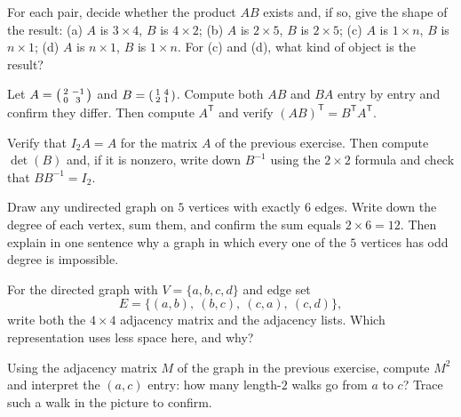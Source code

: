 \begin{exercise}
For each pair, decide whether the product $AB$ exists and, if so, give the shape
of the result: (a) $A$ is $3 \times 4$, $B$ is $4 \times 2$; (b) $A$ is
$2 \times 5$, $B$ is $2 \times 5$; (c) $A$ is $1 \times n$, $B$ is $n \times 1$;
(d) $A$ is $n \times 1$, $B$ is $1 \times n$. For (c) and (d), what kind of object
is the result?
\end{exercise}

\begin{exercise}
Let $A = \begin{psmallmatrix} 2 & -1 \\ 0 & 3 \end{psmallmatrix}$ and
$B = \begin{psmallmatrix} 1 & 4 \\ 2 & 1 \end{psmallmatrix}$. Compute both $AB$
and $BA$ entry by entry and confirm they differ. Then compute $A^{\mathsf T}$ and
verify $(AB)^{\mathsf T} = B^{\mathsf T} A^{\mathsf T}$.
\end{exercise}

\begin{exercise}
Verify that $I_2 A = A$ for the matrix $A$ of the previous exercise. Then compute
$\det(B)$ and, if it is nonzero, write down $B^{-1}$ using the $2 \times 2$
formula and check that $B B^{-1} = I_2$.
\end{exercise}

\begin{exercise}
Draw any undirected graph on $5$ vertices with exactly $6$ edges. Write down the
degree of each vertex, sum them, and confirm the sum equals $2 \times 6 = 12$.
Then explain in one sentence why a graph in which every one of the $5$ vertices
has odd degree is impossible.
\end{exercise}

\begin{exercise}
For the directed graph with $V = \{a,b,c,d\}$ and edge set
\[
E = \{(a,b),\ (b,c),\ (c,a),\ (c,d)\},
\]
write both the $4 \times 4$ adjacency matrix and the adjacency lists. Which
representation uses less space here, and why?
\end{exercise}

\begin{exercise}
Using the adjacency matrix $M$ of the graph in the previous exercise, compute
$M^2$ and interpret the $(a,c)$ entry: how many length-$2$ walks go from $a$ to
$c$? Trace such a walk in the picture to confirm.
\end{exercise}

